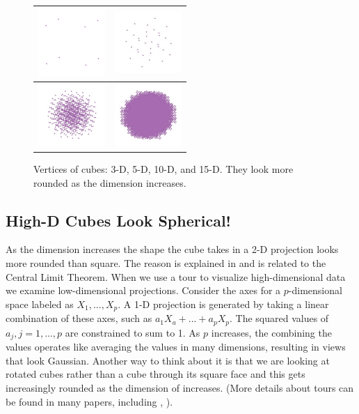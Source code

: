 \begin{figure}[ht]
\centering
\begin{tabular}{|c|c|}
\hline
\includegraphics[width=1in]{fig/cube-3-vert.pdf} & \includegraphics[width=1in]{fig/cube-5-vert.pdf} \\
\hline
\includegraphics[width=1in]{fig/cube-10-vert.pdf} & \includegraphics[width=1in]{fig/cube-15-vert.pdf} \\
\hline
\end{tabular}
\caption{Vertices of cubes: 3-D, 5-D, 10-D, and 15-D. They look more
  rounded as the dimension increases.}
\end{figure}

\subsection{High-D Cubes Look Spherical!}

As the dimension increases the shape the cube takes in a 2-D
projection looks more rounded than square. The reason is explained in
\citet{DF84} and is related to the Central Limit Theorem. When we use
a tour to visualize high-dimensional data we examine low-dimensional
projections.  Consider the axes for a $p$-dimensional space labeled as
$X_1, ..., X_p$. A 1-D projection is generated by taking a linear
combination of these axes, such as $a_1X_a+...+a_pX_p$. The squared
values of $a_j, j=1, ..., p$ are constrained to sum to 1. As $p$
increases, the combining the values operates like averaging the values
in many dimensions, resulting in views that look Gaussian. Another way
to think about it is that we are looking at rotated cubes rather than
a cube through its square face and this gets increasingly rounded as
the dimension of increases. (More details about tours can be found in
many papers, including \cite{BCAH05}, \cite{ClBW07}).


